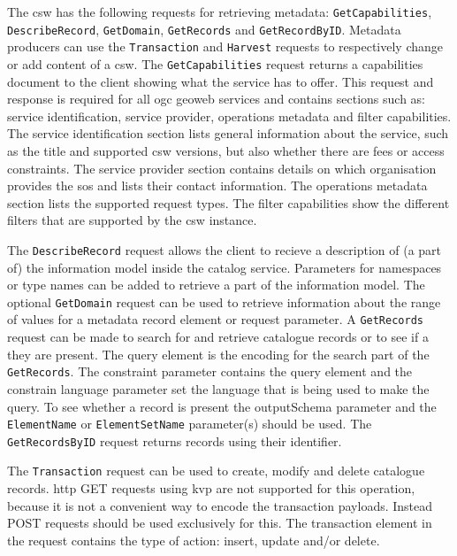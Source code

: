 \begin{sloppypar}
	The \ac{csw} has the following requests for retrieving metadata: \texttt{GetCapabilities},  \texttt{DescribeRecord}, \texttt{GetDomain}, \texttt{GetRecords} and \texttt{GetRecordByID}. Metadata producers can use the \texttt{Transaction} and \texttt{Harvest} requests to respectively change or add content of a \ac{csw}. The \texttt{GetCapabilities} request returns a capabilities document to the client showing what the service has to offer. This request and response is required for all \ac{ogc} geoweb services and contains sections such as: service identification, service provider, operations metadata and filter capabilities. The service identification section lists general information about the service, such as the title and supported \ac{csw} versions, but also whether there are fees or access constraints. The service provider section contains details on which organisation provides the \ac{sos} and lists their contact information. The operations metadata section lists the supported request types. The filter capabilities show the different filters that are supported by the \ac{csw} instance. 
\end{sloppypar}

The \texttt{DescribeRecord} request allows the client to recieve a description of (a part of) the information model inside the catalog service. Parameters for namespaces or type names can be added to retrieve a part of the information model. The optional \texttt{GetDomain} request can be used to retrieve information about the range of values for a metadata record element or request parameter. A \texttt{GetRecords} request can be made to search for and retrieve catalogue records or to see if a they are present. The query element is the encoding for the search part of the \texttt{GetRecords}. The constraint parameter contains the query element and the constrain language parameter set the language that is being used to make the query. To see whether a record is present the outputSchema parameter and the \texttt{ElementName} or \texttt{ElementSetName} parameter(s) should be used. The \texttt{GetRecordsByID} request returns records using their identifier.

The \texttt{Transaction} request can be used to create, modify and delete catalogue records. \ac{http} GET requests using \ac{kvp} are not supported for this operation, because it is not a convenient way to encode the transaction payloads. Instead POST requests should be used exclusively for this. The transaction element in the request contains the type of action: insert, update and/or delete. 

